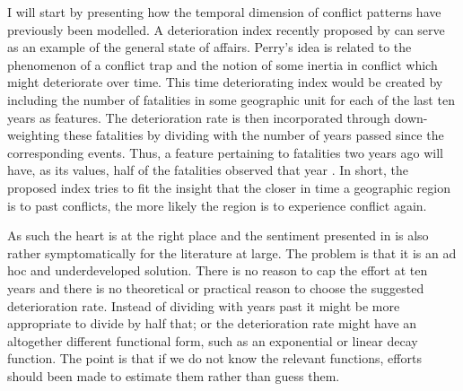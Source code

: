 \documentclass[a4paper]{article}
\begin{document}

I will start by presenting how the temporal dimension of conflict patterns have previously been modelled. A deterioration index recently proposed by \cite{perry_2013} can serve as an example of the general state of affairs. Perry's idea is related to the phenomenon of a conflict trap and the notion of some inertia in conflict which might deteriorate over time. This time deteriorating index would be created by including the number of fatalities in some geographic unit for each of the last ten years as features. The deterioration rate is then incorporated through down-weighting these fatalities by dividing with the number of years passed since the corresponding events. Thus, a feature pertaining to fatalities two years ago will have, as its values, half of the fatalities observed that year \cite[14]{perry_2013}. In short, the proposed index tries to fit the insight that the closer in time a geographic region is to past conflicts, the more likely the region is to experience conflict again.\par

As such the heart is at the right place and the sentiment presented in \cite{perry_2013} is also rather symptomatically for the literature at large. The problem is that it is an ad hoc and underdeveloped solution. There is no reason to cap the effort at ten years and there is no theoretical or practical reason to choose the suggested deterioration rate. Instead of dividing with years past it might be more appropriate to divide by half that; or the deterioration rate might have an altogether different functional form, such as an exponential or linear decay function. The point is that if we do not know the relevant functions, efforts should been made to estimate them rather than guess them.\par 
\end{document}
